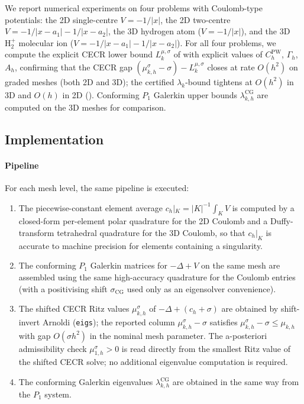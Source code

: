 \documentclass[11pt]{article}
\theoremstyle{plain}
\theoremstyle{definition}
\theoremstyle{remark}
\newcommand{\CG}{\mathrm{CG}}
\begin{document}
We report numerical experiments on four problems with Coulomb-type
potentials: the 2D single-centre $V=-1/|x|$, the 2D two-centre
$V=-1/|x-a_1|-1/|x-a_2|$, the 3D hydrogen atom ($V=-1/|x|$), and
the 3D $\mathrm{H}_2^+$ molecular ion
($V=-1/|x-a_1|-1/|x-a_2|$).
For all four problems, we compute the explicit CECR lower bound
$L_k^{\mu,\sigma}$ of  with explicit
values of $C_h^{\mathrm{PW}}$, $\Gamma_h$, $A_h$, confirming that
the CECR gap $(\mu_{k,h}^\sigma{-}\sigma)-L_k^{\mu,\sigma}$ closes at
rate $O(h^2)$ on graded meshes (both 2D and 3D);
the certified $\lambda_k$-bound tightens at $O(h^2)$ in 3D and
$O(h)$ in 2D ().
Conforming $P_1$ Galerkin upper bounds $\lambda_{k,h}^{\CG}$ are
computed on the 3D meshes for comparison.


\subsection{Implementation}
\label{subsec:implementation}

\paragraph{Pipeline}
For each mesh level, the same pipeline is
executed:
\begin{enumerate}[label=(\roman*)]
  \item The piecewise-constant element average $c_h|_K=|K|^{-1}\!\int_K V$
    is computed by a closed-form per-element polar quadrature for the
    2D Coulomb and a Duffy-transform tetrahedral quadrature for the
    3D Coulomb, so that $c_h|_K$ is accurate to machine precision
    for elements containing a singularity.
  \item The conforming $P_1$ Galerkin matrices for $-\Delta+V$ on the
    same mesh are assembled using the same high-accuracy quadrature for
    the Coulomb entries (with a positivising shift $\sigma_{\CG}$ used
    only as an eigensolver convenience).
  \item The shifted CECR Ritz values $\mu_{k,h}^\sigma$ of
    $-\Delta+(c_h+\sigma)$ are obtained by shift-invert Arnoldi
    (\texttt{eigs}); the reported column $\mu_{k,h}^\sigma{-}\sigma$
    satisfies $\mu_{k,h}^\sigma{-}\sigma\le\mu_{k,h}$ with gap
    $O(\sigma h^2)$ in the nominal mesh parameter.
    The a-posteriori admissibility check $\mu_{1,h}^\sigma>0$ is read
    directly from the smallest Ritz value of the shifted CECR solve;
    no additional eigenvalue computation is required.
  \item The conforming Galerkin eigenvalues $\lambda_{k,h}^{\CG}$
    are obtained in the same way from the $P_1$ system.
\end{enumerate}
\end{document}
